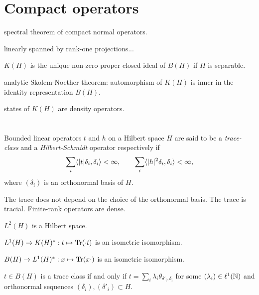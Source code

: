 \documentclass{../../large}
\begin{document}


\section{Compact operators}

spectral theorem of compact normal operators.


linearly spanned by rank-one projections...

$K(H)$ is the unique non-zero proper closed ideal of $B(H)$ if $H$ is separable.


analytic Skolem-Noether theorem: automorphism of $K(H)$ is inner in the identity representation $B(H)$.

states of $K(H)$ are density operators.


\section{}
\begin{prb}[Traces]
Bounded linear operators $t$ and $h$ on a Hilbert space $H$ are said to be a \emph{trace-class} and a \emph{Hilbert-Schmidt} operator respectively if
\[\sum_i\langle|t|\delta_i,\delta_i\rangle<\infty,\qquad\sum_i\langle|h|^2\delta_i,\delta_i\rangle<\infty,\]
where $(\delta_i)$ is an orthonormal basis of $H$.
\begin{parts}
\item
The trace does not depend on the choice of the orthonormal basis.
The trace is tracial.
Finite-rank operators are dense.
\item $L^2(H)$ is a Hilbert space.
\item $L^1(H)\to K(H)^*:t\mapsto\operatorname{Tr}(\cdot t)$ is an isometric isomorphism.
\item $B(H)\to L^1(H)^*:x\mapsto\operatorname{Tr}(x\cdot)$ is an isometric isomorphism.
\item $t\in B(H)$ is a trace class if and only if $t=\sum_i\lambda_i\theta_{\delta'_i,\delta_i}$ for some $(\lambda_i)\in\ell^1(\mathbb{N})$ and orthonormal sequences $(\delta_i),(\delta'_i)\subset H$.
\end{parts}
\end{prb}
\end{document}
